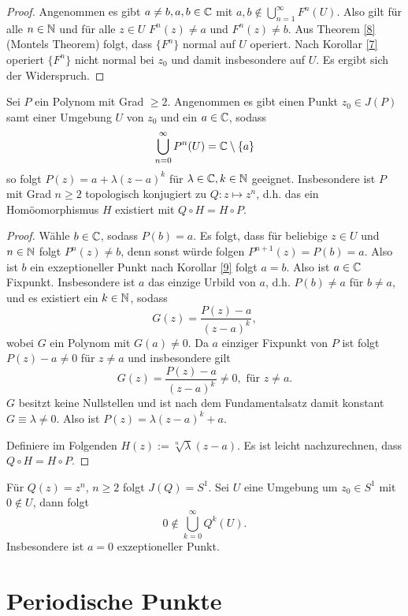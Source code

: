 \documentclass{mywork}
\begin{document}
\begin{proof}
Angenommen es gibt $a\neq b, a,b \in \mathbb{C}$ mit $a,b \not\in \bigcup_{n=1}^\infty F^n(U)$. Also gilt für alle $n\in \mathbb{N}$ und für alle $z\in U$ $F^n(z)\neq a$ und $F^n(z)\neq b$. Aus Theorem \ref{8} (Montels Theorem) folgt, dass $\{F^n\}$ normal auf $U$ operiert. Nach Korollar \ref{7} operiert $\{F^n\}$ nicht normal bei $z_0$ und damit insbesondere auf $U$. Es ergibt sich der Widerspruch.
\end{proof}

\begin{thm}\label{10}
Sei $P$ ein Polynom mit Grad $\ge 2$. Angenommen es gibt einen Punkt $z_0\in J(P)$ samt einer Umgebung $U$ von $z_0$ und ein $a\in \mathbb{C}$, sodass 
\[
\bigcup_{n=0}^\infty P^{n}(U)=\mathbb{C}\setminus\{a\}
\]
so folgt $P(z)=a+\lambda(z-a)^k$ für $\lambda \in \mathbb{C}, k\in \mathbb{N}$ geeignet. 
Insbesondere ist $P$ mit Grad $n\ge 2$ topologisch konjugiert zu $Q: z \mapsto z^n$, d.h. 
das ein Homöomorphismus $H$ existiert mit $Q\circ H=H\circ P$.
\end{thm}

\begin{proof}
Wähle $b\in \mathbb{C}$, sodass $P(b)=a$. Es folgt, dass für beliebige $z\in U$ und $n\in \mathbb{N}$ folgt $P^n(z)\neq b$, denn sonst würde folgen $P^{n+1}(z)=P(b)=a$. Also ist $b$ ein exzeptioneller Punkt nach Korollar \ref{9} folgt $a=b$. Also ist $a\in \mathbb{C}$ Fixpunkt. Insbesondere ist $a$ das einzige Urbild von $a$, d.h. $P(b)\neq a$ für $b\neq a$, und es existiert ein $k\in \mathbb{N}$, sodass
\[
G(z)=\frac{P(z)-a}{(z-a)^k},
\] 
wobei $G$ ein Polynom mit $G(a)\neq 0$. Da $a$ einziger Fixpunkt von $P$ ist folgt $P(z)-a\neq 0$ für $z\neq a$ und insbesondere gilt
\[
G(z)=\frac{P(z)-a}{(z-a)^k}\neq 0, \text{ für } z \neq a.
\]
$G$ besitzt keine Nullstellen und ist nach dem Fundamentalsatz damit konstant $G\equiv \lambda\neq 0$. Also ist $P(z)=\lambda (z-a)^k+a$.

Definiere im Folgenden $H(z):=\sqrt[n]{\lambda}(z-a)$. Es ist leicht nachzurechnen, dass $Q\circ H=H\circ P$.
\end{proof}

\begin{ex} \label{11}
Für $Q(z)=z^n$, $n\ge 2$ folgt $J(Q)=S^1$. Sei $U$ eine Umgebung um $z_0\in S^1$ mit $0\not\in U$, dann folgt 
\[
0\not\in \bigcup_{k=0}^\infty Q^k(U).
\] 
Insbesondere ist $a=0$ exzeptioneller Punkt.
\end{ex}



\section{Periodische Punkte}
\end{document}
